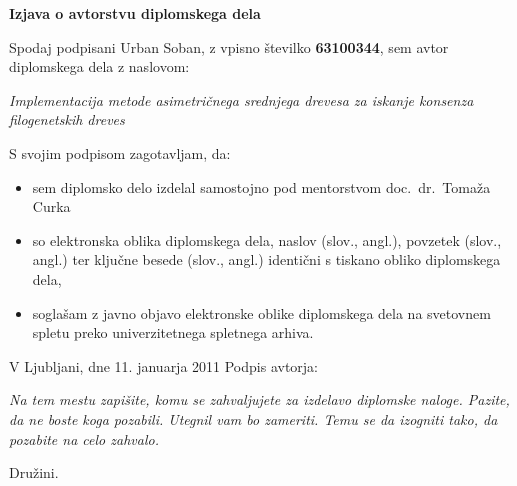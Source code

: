 \documentclass[a4paper, 12pt]{book}
\newcommand{\clearemptydoublepage}{\newpage{\pagestyle{empty}\cleardoublepage}}
\begin{document}
\vspace{2cm}

\clearemptydoublepage

\vspace*{1cm}
\begin{center}
{\Large \textbf{\sc Izjava o avtorstvu diplomskega dela}}
\end{center}

\vspace{1cm}
\noindent Spodaj podpisani Urban Soban,
z vpisno številko \textbf{63100344}, sem avtor  diplomskega dela z naslovom:

\vspace{0.5cm}
\emph{Implementacija metode asimetričnega srednjega drevesa za iskanje konsenza filogenetskih dreves}

\vspace{1.5cm}
\noindent S svojim podpisom zagotavljam, da:
\begin{itemize}
	\item sem diplomsko delo izdelal samostojno pod mentorstvom
		doc.\ dr.\ Tomaža Curka

	\item	so elektronska oblika diplomskega dela, naslov (slov., angl.), povzetek (slov., angl.) ter ključne besede (slov., angl.) identični s tiskano obliko diplomskega dela,
	\item soglašam z javno objavo elektronske oblike diplomskega dela na svetovnem spletu preko univerzitetnega spletnega arhiva.	
\end{itemize}

\vspace{1cm}
\noindent V Ljubljani, dne 11. januarja 2011 \hfill Podpis avtorja:

\clearemptydoublepage

\thispagestyle{empty}\mbox{}\vfill\null\it%
Na tem mestu zapišite, komu se zahvaljujete za izdelavo diplomske naloge. Pazite, da ne boste koga pozabili. Utegnil vam bo zameriti. Temu se da izogniti tako, da pozabite na celo zahvalo.
\rm\normalfont

\clearemptydoublepage

\thispagestyle{empty}\mbox{}{\textheight}\mbox{}\hfill\begin{minipage}{0.55\textwidth}%
Družini.
\normalfont\end{minipage}
\end{document}
